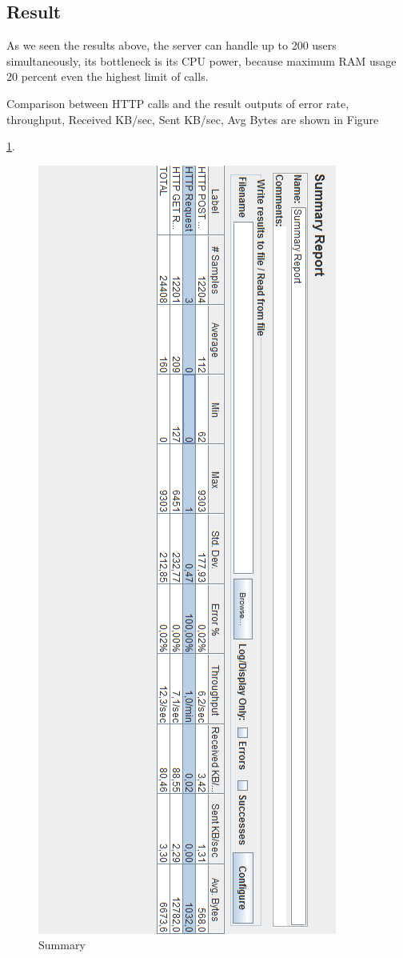 \newpage
 
\subsection{Result}

As we seen the results above, the server can handle up to 200 users simultaneously, its bottleneck is its CPU power, because maximum RAM usage 20 percent even the highest limit of calls.

Comparison between HTTP calls and the result outputs of error rate, throughput, Received KB/sec, Sent KB/sec, Avg Bytes are shown in Figure

\ref{fig:summaryReport}.

\begin{figure}[!htbp]
\centering
\includegraphics[width=\textwidth]{projectChapters/images/summaryReport.png}
\caption{Summary}
\label{fig:summaryReport}
\end{figure}












